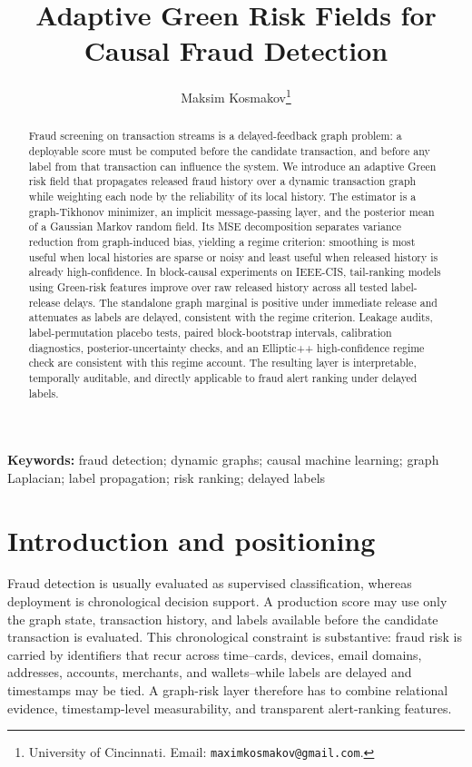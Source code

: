 \documentclass[11pt]{article}
\title{Adaptive Green Risk Fields for Causal Fraud Detection}
\author{Maksim Kosmakov\thanks{University of Cincinnati. Email: \texttt{maximkosmakov@gmail.com}.}}
\date{}
\theoremstyle{definition}
\theoremstyle{remark}
\begin{document}
\maketitle

\begin{abstract}
Fraud screening on transaction streams is a delayed-feedback graph problem: a deployable score must be computed before the candidate transaction, and before any label from that transaction can influence the system. We introduce an adaptive Green risk field that propagates released fraud history over a dynamic transaction graph while weighting each node by the reliability of its local history. The estimator is a graph-Tikhonov minimizer, an implicit message-passing layer, and the posterior mean of a Gaussian Markov random field. Its MSE decomposition separates variance reduction from graph-induced bias, yielding a regime criterion: smoothing is most useful when local histories are sparse or noisy and least useful when released history is already high-confidence. In block-causal experiments on IEEE-CIS, tail-ranking models using Green-risk features improve over raw released history across all tested label-release delays. The standalone graph marginal is positive under immediate release and attenuates as labels are delayed, consistent with the regime criterion. Leakage audits, label-permutation placebo tests, paired block-bootstrap intervals, calibration diagnostics, posterior-uncertainty checks, and an Elliptic++ high-confidence regime check are consistent with this regime account. The resulting layer is interpretable, temporally auditable, and directly applicable to fraud alert ranking under delayed labels.
\end{abstract}

\noindent\textbf{Keywords:} fraud detection; dynamic graphs; causal machine learning; graph Laplacian; label propagation; risk ranking; delayed labels

\vspace{0.75em}

\section{Introduction and positioning}

Fraud detection is usually evaluated as supervised classification, whereas deployment is chronological decision support. A production score may use only the graph state, transaction history, and labels available before the candidate transaction is evaluated. This chronological constraint is substantive: fraud risk is carried by identifiers that recur across time--cards, devices, email domains, addresses, accounts, merchants, and wallets--while labels are delayed and timestamps may be tied. A graph-risk layer therefore has to combine relational evidence, timestamp-level measurability, and transparent alert-ranking features.
\end{document}
